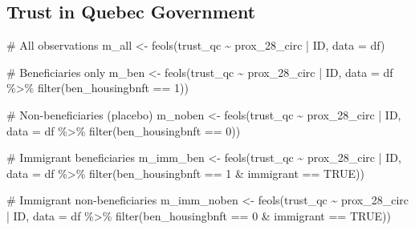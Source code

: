 \documentclass[
  letterpaper,
  DIV=11,
  numbers=noendperiod]{scrartcl}
\newenvironment{Shaded}{\begin{snugshade}}{\end{snugshade}}
\newcommand{\AttributeTok}[1]{\textcolor[rgb]{0.40,0.45,0.13}{#1}}
\newcommand{\CommentTok}[1]{\textcolor[rgb]{0.37,0.37,0.37}{#1}}
\newcommand{\ConstantTok}[1]{\textcolor[rgb]{0.56,0.35,0.01}{#1}}
\newcommand{\DecValTok}[1]{\textcolor[rgb]{0.68,0.00,0.00}{#1}}
\newcommand{\FunctionTok}[1]{\textcolor[rgb]{0.28,0.35,0.67}{#1}}
\newcommand{\NormalTok}[1]{\textcolor[rgb]{0.00,0.23,0.31}{#1}}
\newcommand{\OtherTok}[1]{\textcolor[rgb]{0.00,0.23,0.31}{#1}}
\newcommand{\SpecialCharTok}[1]{\textcolor[rgb]{0.37,0.37,0.37}{#1}}
\begin{document}
\hypertarget{trust-in-quebec-government}{%
\subsection{Trust in Quebec
Government}\label{trust-in-quebec-government}}

\begin{Shaded}
\begin{Highlighting}[]
\CommentTok{\# All observations}
\NormalTok{m\_all }\OtherTok{\textless{}{-}} \FunctionTok{feols}\NormalTok{(trust\_qc }\SpecialCharTok{\textasciitilde{}}\NormalTok{ prox\_28\_circ }\SpecialCharTok{|}\NormalTok{ ID, }\AttributeTok{data =}\NormalTok{ df)}

\CommentTok{\# Beneficiaries only}
\NormalTok{m\_ben }\OtherTok{\textless{}{-}} \FunctionTok{feols}\NormalTok{(trust\_qc }\SpecialCharTok{\textasciitilde{}}\NormalTok{ prox\_28\_circ }\SpecialCharTok{|}\NormalTok{ ID,}
               \AttributeTok{data =}\NormalTok{ df }\SpecialCharTok{\%\textgreater{}\%} \FunctionTok{filter}\NormalTok{(ben\_housingbnft }\SpecialCharTok{==} \DecValTok{1}\NormalTok{))}

\CommentTok{\# Non{-}beneficiaries (placebo)}
\NormalTok{m\_noben }\OtherTok{\textless{}{-}} \FunctionTok{feols}\NormalTok{(trust\_qc }\SpecialCharTok{\textasciitilde{}}\NormalTok{ prox\_28\_circ }\SpecialCharTok{|}\NormalTok{ ID,}
                 \AttributeTok{data =}\NormalTok{ df }\SpecialCharTok{\%\textgreater{}\%} \FunctionTok{filter}\NormalTok{(ben\_housingbnft }\SpecialCharTok{==} \DecValTok{0}\NormalTok{))}

\CommentTok{\# Immigrant beneficiaries}
\NormalTok{m\_imm\_ben }\OtherTok{\textless{}{-}} \FunctionTok{feols}\NormalTok{(trust\_qc }\SpecialCharTok{\textasciitilde{}}\NormalTok{ prox\_28\_circ }\SpecialCharTok{|}\NormalTok{ ID,}
                   \AttributeTok{data =}\NormalTok{ df }\SpecialCharTok{\%\textgreater{}\%} \FunctionTok{filter}\NormalTok{(ben\_housingbnft }\SpecialCharTok{==} \DecValTok{1} \SpecialCharTok{\&}\NormalTok{ immigrant }\SpecialCharTok{==} \ConstantTok{TRUE}\NormalTok{))}

\CommentTok{\# Immigrant non{-}beneficiaries}
\NormalTok{m\_imm\_noben }\OtherTok{\textless{}{-}} \FunctionTok{feols}\NormalTok{(trust\_qc }\SpecialCharTok{\textasciitilde{}}\NormalTok{ prox\_28\_circ }\SpecialCharTok{|}\NormalTok{ ID,}
                     \AttributeTok{data =}\NormalTok{ df }\SpecialCharTok{\%\textgreater{}\%} \FunctionTok{filter}\NormalTok{(ben\_housingbnft }\SpecialCharTok{==} \DecValTok{0} \SpecialCharTok{\&}\NormalTok{ immigrant }\SpecialCharTok{==} \ConstantTok{TRUE}\NormalTok{))}


\end{Highlighting}
\end{Shaded}
\end{document}
